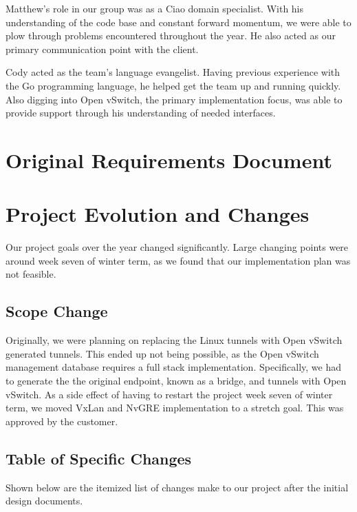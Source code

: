 \documentclass[10pt,onecolumn,journal,draftclsnofoot]{IEEEtran}
\begin{document}
Matthew's role in our group was as a Ciao domain specialist. With his understanding of the
code base and constant forward momentum, we were able to plow through problems encountered
throughout the year. He also acted as our primary communication point with the client.

Cody acted as the team's language evangelist. Having previous experience with the Go
programming language, he helped get the team up and running quickly. Also digging into Open
vSwitch, the primary implementation focus, was able to provide support through his
understanding of needed interfaces.

\section{Original Requirements Document}



\section{Project Evolution and Changes}
Our project goals over the year changed significantly. Large changing points were around
week seven of winter term, as we found that our implementation plan was not feasible. 

\subsection{Scope Change}
 Originally, we were planning on replacing the Linux tunnels with Open vSwitch generated
 tunnels. This ended up not being possible, as the Open vSwitch management database requires
 a full stack implementation. Specifically, we had to generate the the original endpoint,
 known as a bridge, and tunnels with Open vSwitch. As a side effect of having to restart the
 project week seven of winter term, we moved VxLan and NvGRE implementation to a stretch
 goal. This was approved by the customer.
 
\subsection{Table of Specific Changes}
Shown below are the itemized list of changes make to our project after the initial design
documents.

\end{document}
